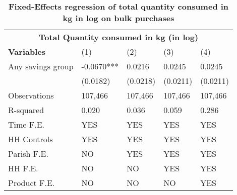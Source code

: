 \begin{table}[!h]
\centering
\begin{tabular}{lllll}
 \hline
 \multicolumn{5}{c}{\bfseries  Total Quantity consumed in kg (in log)} \\
\cline{1-5}
 {\bfseries Variables} & (1) & (2) & (3) & (4)
  & \\
\hline
Any savings group & -0.0670*** & 0.0216 & 0.0245 & 0.0245 \\
 & (0.0182)	& (0.0218)	& (0.0211)	& (0.0211)
 &\\
 
Observations & 107,466  & 107,466 & 107,466 & 107,466
\\
R-squared & 0.020 &	0.036 &	0.059 &	0.286
\\
Time F.E. & YES & YES & YES & YES \\
HH Controls & YES & YES & YES & YES \\
Parish F.E. & NO & YES & YES & YES\\
HH F.E. & NO & NO & YES & YES\\
 Product F.E. & NO & NO & NO & YES \\ \hline
\cline{1-5}
\end{tabular}
\caption{\bfseries Fixed-Effects regression of total quantity consumed in kg in log on bulk purchases}
\hline\\
\end{table}



